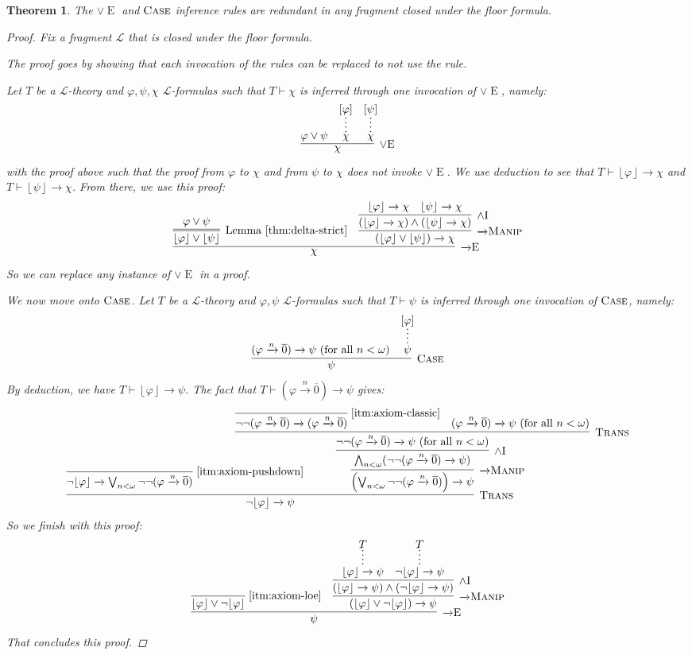 \documentclass{amsart}
\newtheorem{theorem}{Theorem}[section]
\theoremstyle{definition}
\numberwithin{equation}{theorem}
\renewcommand{\phi}{\varphi}
\newcommand{\unvee}{{\vee}}
\newcommand{\unwedge}{{\wedge}}
\newcommand{\proves}{\vdash}
\newcommand{\strict}[1]{{\left\lfloor#1\right\rfloor}}
\newcommand{\rat}[1]{{\overline{#1}}}
\newcommand{\narrow}[1]{\xrightarrow{#1}}
\renewcommand{\to}{\narrow{}}
\newcommand{\arr}{{\to}}
\newcommand{\intro}{\!\operatorname{I}}
\newcommand{\elim}{\!\operatorname{E}}
\newcommand{\trans}{\text{\sc{Trans}}}
\newcommand{\aref}[1]{\!\text{\ref{itm:axiom-#1}}}
\newcommand{\pushdown}{\arr\text{\sc{Manip}}}
\newcommand{\frag}{\mathcal{L}}
\begin{document}
\begin{theorem}\label{thm:redundancy}
  The $\unvee\elim$ and $\text{\sc{Case}}$ inference rules are redundant in any fragment closed under the floor formula. 
  \begin{proof}
    Fix a fragment $\frag$ that is closed under the floor formula.
    
    The proof goes by showing that each invocation of the rules can be replaced to not use the rule.
    
    Let $T$ be a $\frag$-theory and $\phi,\psi,\chi$ $\frag$-formulas such that $T\proves\chi$ is inferred through one invocation of $\unvee\elim$, namely:
    \[
      \infer[\unvee\elim]{\chi}{
	      \phi\vee\psi &
	      \infer*{\chi}{[\phi]} &
	      \infer*{\chi}{[\psi]}
	    }
    \]
    with the proof above such that the proof from $\phi$ to $\chi$ and from $\psi$ to $\chi$ does not invoke $\unvee\elim$.
    We use deduction to see that $T\proves\strict\phi\to\chi$ and $T\proves\strict\psi\to\chi$.
    From there, we use this proof:
    \[
      \infer[\arr\elim]{\chi}{
        \infer=[\text{Lemma~\ref{thm:delta-strict}}]{\strict\phi\vee\strict\psi}{\phi\vee\psi}&
        \infer[\pushdown]{(\strict\phi\vee\strict\psi)\to\chi}{
          \infer[\unwedge\intro]{(\strict\phi\to\chi)\wedge(\strict\psi\to\chi)}{
            \strict\phi\to\chi &
            \strict\psi\to\chi
          }
        }
      }
    \]
    So we can replace any instance of $\unvee\elim$ in a proof.
    
    We now move onto $\text{\sc{Case}}$.
    Let $T$ be a $\frag$-theory and $\phi,\psi$ $\frag$-formulas such that $T\proves\psi$ is inferred through one invocation of $\text{\sc{Case}}$, namely:
    \[
      \infer[\caserule]{\psi}{
	      (\phi\narrow n\rat 0)\to\psi\text{ (for all $n<\omega$)} &
	      \infer*{\psi}{[\phi]}
	    } 
    \]
    By deduction, we have $T\proves\strict\phi\to\psi$.
    The fact that $T\proves(\phi\narrow{n}\rat 0)\to\psi$ gives:
    \[
	    \infer[\trans]{\neg\strict\phi\to\psi}{
        \infer[\aref{pushdown}]{\neg\strict\phi\to\bigvee_{n<\omega}\neg\neg(\phi\narrow{n}\rat 0)}{} &
        \!\!\!\!\!\!\!\!\!\!\!\!\!\!\!\!\!\!\!\!\!\!\!\!\!\!\!\!\!\!\!\!\!\!\!\!\!\!\!\!\!\!\!
        \infer[\pushdown]{\left(\bigvee_{n<\omega}\neg\neg(\phi\narrow{n}\rat 0)\right)\to\psi}{
          \infer[\unwedge\intro]{\bigwedge_{n<\omega}(\neg\neg(\phi\narrow{n}\rat 0)\to\psi)}{
            \infer[\trans]{\neg\neg(\phi\narrow{n}\rat 0)\to\psi\text{ (for all $n<\omega$)}}{
              \infer[\aref{classic}]{\neg\neg(\phi\narrow{n}\rat 0)\to(\phi\narrow{n}\rat 0)}{} &
              (\phi\narrow{n}\rat 0)\to\psi\text{ (for all $n<\omega$)}
            }
          }
        }
      }
    \]
    So we finish with this proof:
    \[
      \infer[\arr\elim]{\psi}{
        \infer[\aref{loe}]{\strict\phi\vee\neg\strict\phi}{} &
        \infer[\pushdown]{(\strict\phi\vee\neg\strict\phi)\to\psi}{
          \infer[\unwedge\intro]{(\strict\phi\to\psi)\wedge(\neg\strict\phi\to\psi)}{
            \infer*{\strict\phi\to\psi}{T} &
            \infer*{\neg\strict\phi\to\psi}{T}
          }
        }
      }
    \]
    That concludes this proof.
  \end{proof}
\end{theorem}
\end{document}
